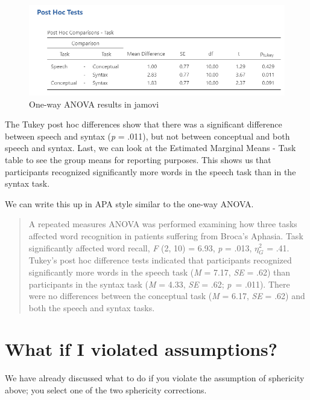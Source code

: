 \documentclass[
]{book}
\begin{document}
\begin{figure}

{\centering \includegraphics[width=1\linewidth]{images/05-repeated-measures-anova/rm-anova_tukey} 

}

\caption{One-way ANOVA results in jamovi}\label{fig:unnamed-chunk-8}
\end{figure}

The Tukey post hoc differences show that there was a significant difference between speech and syntax (\emph{p} = .011), but not between conceptual and both speech and syntax. Last, we can look at the Estimated Marginal Means - Task table to see the group means for reporting purposes. This shows us that participants recognized significantly more words in the speech task than in the syntax task.

We can write this up in APA style similar to the one-way ANOVA.

\begin{quote}
A repeated measures ANOVA was performed examining how three tasks affected word recognition in patients suffering from Broca's Aphasia. Task significantly affected word recall, \emph{F} (2, 10) = 6.93, \emph{p} = .013, \(\eta^2_G\) = .41. Tukey's post hoc difference tests indicated that participants recognized significantly more words in the speech task (\emph{M} = 7.17, \emph{SE} = .62) than participants in the syntax task (\emph{M} = 4.33, \emph{SE} = .62; \emph{p}~= .011). There were no differences between the conceptual task (\emph{M} = 6.17, \emph{SE} = .62) and both the speech and syntax tasks.
\end{quote}

\hypertarget{what-if-i-violated-assumptions-3}{%
\section{What if I violated assumptions?}\label{what-if-i-violated-assumptions-3}}

We have already discussed what to do if you violate the assumption of sphericity above; you select one of the two sphericity corrections.
\end{document}
